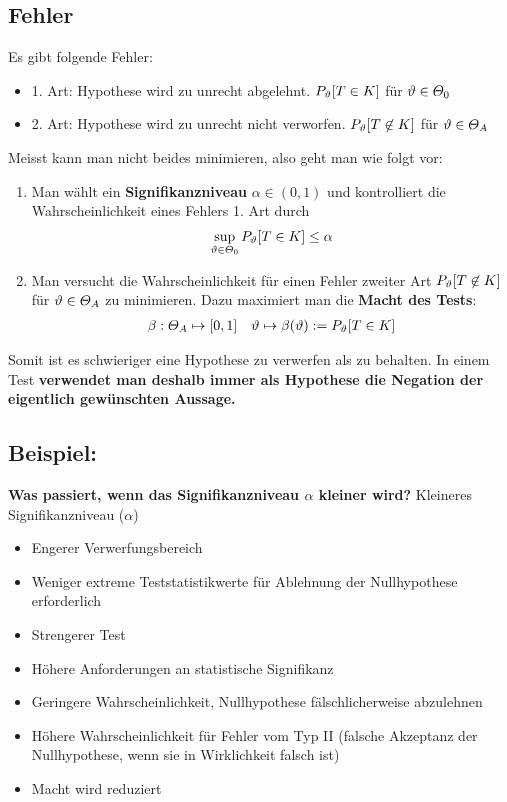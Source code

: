\subsection{Fehler}
Es gibt folgende Fehler:
\begin{itemize}
  \item 1. Art: Hypothese wird zu unrecht abgelehnt. $P_\vartheta[T \in K]$ für $\vartheta \in \varTheta_0$
  \item 2. Art: Hypothese wird zu unrecht nicht verworfen. $P_\vartheta[T \not \in K]$ für $\vartheta \in \varTheta_A$
\end{itemize}


Meisst kann man nicht beides minimieren, also geht man wie folgt vor:
\begin{enumerate}
  \item Man wählt ein \textbf{Signifikanzniveau} $\alpha \in (0, 1)$ und kontrolliert
        die Wahrscheinlichkeit eines Fehlers 1. Art durch
        \begin{align*}
          \sup_{\vartheta \in \varTheta_0} P_\vartheta[T \in K] \leq \alpha
        \end{align*}
  \item Man versucht die Wahrscheinlichkeit für einen Fehler zweiter Art $P_\vartheta[T \not
            \in K]$ für $\vartheta \in \varTheta_A$ zu minimieren. Dazu maximiert man die
        \textbf{Macht des Tests}:
        \begin{align*}
          \beta : \varTheta_A \mapsto [0, 1] &  & \vartheta \mapsto \beta (\vartheta) := P_\vartheta[T \in K]
        \end{align*}
\end{enumerate}
Somit ist es schwieriger eine Hypothese zu verwerfen als zu behalten. In einem
Test \textbf{verwendet man deshalb immer als Hypothese die Negation der eigentlich gewünschten Aussage.}
\BoxStart{}
\subsection{Beispiel:}
\textbf{Was passiert, wenn das Signifikanzniveau $\alpha$ kleiner wird?}
Kleineres Signifikanzniveau ($\alpha$)
\begin{itemize}
  \item Engerer Verwerfungsbereich
  \item Weniger extreme Teststatistikwerte für Ablehnung der Nullhypothese erforderlich
  \item Strengerer Test
  \item Höhere Anforderungen an statistische Signifikanz
  \item Geringere Wahrscheinlichkeit, Nullhypothese fälschlicherweise abzulehnen
  \item Höhere Wahrscheinlichkeit für Fehler vom Typ II (falsche Akzeptanz der Nullhypothese, wenn sie in Wirklichkeit falsch ist)
  \item Macht wird reduziert
\end{itemize}
\BoxEnd{}
